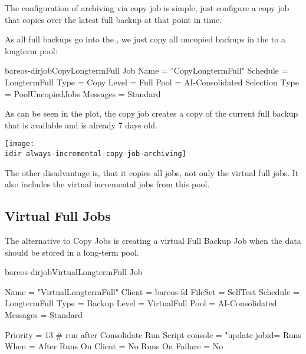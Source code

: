 The configuration of archiving via copy job is simple, just configure a copy job that copies over the latest full backup
at that point in time.

As all full backups go into the , we just copy all uncopied backups in the  to a longterm pool:

\begin{bareosConfigResource}{bareos-dir}{job}{CopyLongtermFull}
Job {
  Name = "CopyLongtermFull"
  Schedule = LongtermFull
  Type = Copy
  Level = Full
  Pool = AI-Consolidated
  Selection Type = PoolUncopiedJobs
  Messages = Standard
}
\end{bareosConfigResource}

As can be seen in the plot, the copy job creates a copy of the current full backup that is available and is already 7 days old.
\begin{center}
\texttt{[image: \\idir always-incremental-copy-job-archiving]}
\end{center}

The other disadvantage is, that it copies all jobs, not only the virtual full jobs. It also includes the virtual incremental jobs from this pool.


\subsection{Virtual Full Jobs}

The alternative to Copy Jobs is creating a virtual Full Backup Job when the data should be stored in a long-term pool.

\begin{bareosConfigResource}{bareos-dir}{job}{VirtualLongtermFull}
Job {
  Name = "VirtualLongtermFull"
  Client = bareos-fd
  FileSet = SelfTest
  Schedule = LongtermFull
  Type = Backup
  Level = VirtualFull
  Pool = AI-Consolidated
  Messages = Standard

  Priority = 13                 # run after  Consolidate
  Run Script {
        console = "update jobid=%
        Runs When = After
        Runs On Client = No
        Runs On Failure = No
  }
}
\end{bareosConfigResource}


